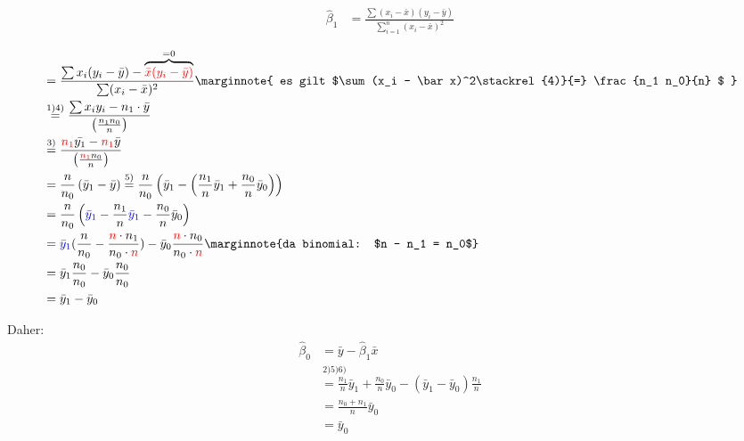\begin{align}
	\hat\beta_1&=\frac{\sum (x_i - \bar x)(y_i - \bar y)}{\sum^{n}_{i=1} (x_i - \bar x)^2}
\end{align}

\begin{align*}
	&=\frac{\sum x_i(y_i-\bar y)-\overbrace{\comment{\bar x(y_i-\bar
y)}}^{=0}}{\sum (x_i - \bar x)^2}
\marginnote{
	es gilt $\sum (x_i - \bar x)^2\stackrel{4)}{=} \frac{n_1 n_0}{n} $
}\\
&\stackrel{1)4)}{=}\frac{\sum x_iy_i -{n_1}\cdot\bar y}{\left(
\frac{n_1 n_0}{n}
\right)}\\
&\stackrel{3)}{=}\frac{\textcolor{red}{n_1}\bar {y_1} -
\textcolor{red}{n_1}\bar y}{\left( \frac{\textcolor{red}{n_1} n_0}{n} \right)}\\
&=\frac{n}{n_0}\left( \bar y_1 - \bar y \right)
\stackrel{5)}{=}\frac{n}{n_0}\left( \bar y_1 - \left(\frac{n_1}{n}\bar y_1 + \frac{n_0}{n}\bar y_0
\right) \right)\\
&=\frac{n}{n_0}\left( \textcolor{blue}{\bar y_1} - \frac{n_1}{n}\textcolor{blue}{\bar y_1} - \frac{n_0}{n}\bar y_0 \right)\\
&=\textcolor{blue}{\bar y_1} (\frac{n}{n_0}-\frac{\comment{n}\cdot
n_1}{n_0\cdot \comment{n}})-\bar y_0\frac{\comment{n}\cdot n_0}{n_0 \cdot
\comment{n}}\marginnote{da binomial: $n - n_1 = n_0$}\\
&=\bar y_1 \frac{n_0}{n_0} - \bar y_0 \frac{n_0}{n_0}\\
&=\bar y_1 -\bar y_0
\end{align*}

 Daher:
\begin{align*}
\hat\beta_0 &=\bar y - \hat\beta_1 \bar x\\
			&\stackrel{2)5)6)}{=\frac{n_1}{n}}\bar y_1 + \frac{n_0}{n}\bar y_0 -
	\left( \bar y_1 - \bar y_0 \right)\frac{n_1}{n}\\
	&=\frac{n_0 + n_1}{n}\bar y_0 \\
	&=\bar y_0
 \end{align*}
\newline

